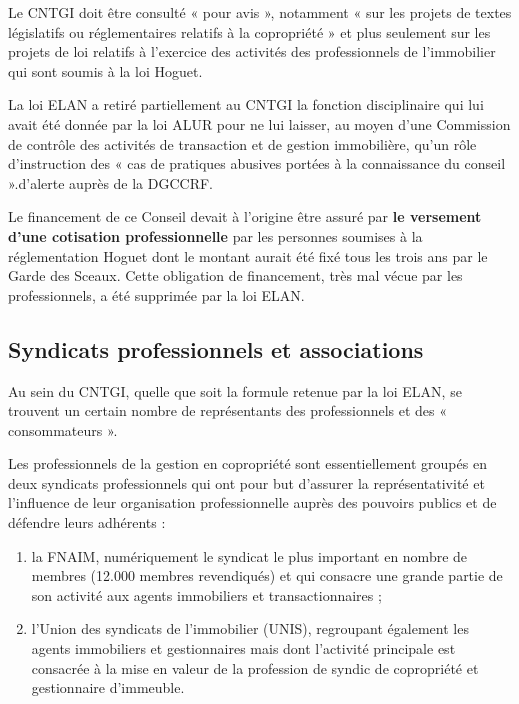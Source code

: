 	Le CNTGI doit être consulté « pour avis », notamment « sur les projets de textes législatifs ou réglementaires relatifs à la copropriété » et plus seulement sur les projets de loi relatifs à l’exercice des activités des professionnels de l’immobilier qui sont soumis à la loi Hoguet.
	
	La loi ELAN a retiré partiellement au CNTGI la fonction disciplinaire qui lui avait été donnée par la loi ALUR pour ne lui laisser, au moyen d’une Commission de contrôle des activités de transaction et de gestion immobilière, qu’un rôle d’instruction des « cas de pratiques abusives portées à la connaissance du conseil ».d’alerte auprès de la DGCCRF.
	
	Le financement de ce Conseil devait à l’origine être assuré par \textbf{le versement d’une cotisation professionnelle} par les personnes soumises à la réglementation Hoguet dont le montant aurait été fixé tous les trois ans par le Garde des Sceaux. Cette obligation de financement, très mal vécue par les professionnels, a été supprimée par la loi ELAN.
	
	\subsection*{Syndicats professionnels et associations}
	Au sein du CNTGI, quelle que soit la formule retenue par la loi ELAN, se trouvent un certain nombre de représentants des professionnels et des « consommateurs ».
	
	Les professionnels de la gestion en copropriété sont essentiellement groupés en deux syndicats professionnels qui ont pour but d’assurer la représentativité et l’influence de leur organisation professionnelle auprès des pouvoirs publics et de défendre leurs adhérents :
	\begin{enumerate}
		\item la FNAIM, numériquement le syndicat le plus important en nombre de membres (12.000 membres revendiqués) et qui consacre une grande partie de son activité aux agents immobiliers et transactionnaires ;
		\item l’Union des syndicats de l'immobilier (UNIS), regroupant également les agents immobiliers et gestionnaires mais dont l’activité principale est consacrée à la mise en valeur de la profession de syndic de copropriété et gestionnaire d’immeuble.
	\end{enumerate}
	

